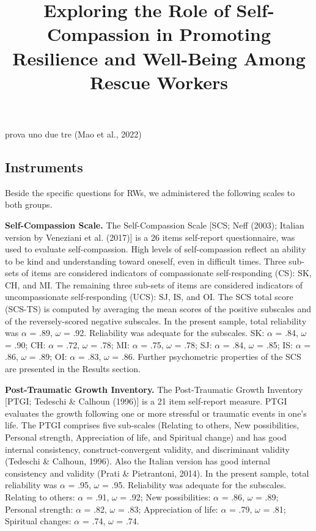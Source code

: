 \documentclass[
]{apa7}
\title{Exploring the Role of Self-Compassion in Promoting Resilience and
Well-Being Among Rescue Workers}
\author{}
\date{}
\begin{document}
\maketitle
\ifdefined\Shaded\renewenvironment{Shaded}{\begin{tcolorbox}[interior hidden, enhanced, breakable, borderline west={3pt}{0pt}{shadecolor}, sharp corners, boxrule=0pt, frame hidden]}{\end{tcolorbox}}\fi

prova uno due tre (Mao et al., 2022)

\hypertarget{instruments}{%
\subsection{Instruments}\label{instruments}}

Beside the specific questions for RWs, we administered the following
scales to both groups.

\textbf{Self-Compassion Scale.} The Self-Compassion Scale {[}SCS; Neff
(2003); Italian version by Veneziani et al. (2017){]} is a 26 items
self-report questionnaire, was used to evaluate self-compassion. High
levels of self-compassion reflect an ability to be kind and
understanding toward oneself, even in difficult times. Three sub-sets of
items are considered indicators of compassionate self-responding (CS):
SK, CH, and MI. The remaining three sub-sets of items are considered
indicators of uncompassionate self-responding (UCS): SJ, IS, and OI. The
SCS total score (SCS-TS) is computed by averaging the mean scores of the
positive subscales and of the reversely-scored negative subscales. In
the present sample, total reliability was \(\alpha\) = .89, \(\omega\) =
.92. Reliability was adequate for the subscales. SK: \(\alpha\) = .84,
\(\omega\) = .90; CH: \(\alpha\) = .72, \(\omega\) = .78; MI: \(\alpha\)
= .75, \(\omega\) = .78; SJ: \(\alpha\) = .84, \(\omega\) = .85; IS:
\(\alpha\) = .86, \(\omega\) = .89; OI: \(\alpha\) = .83, \(\omega\) =
.86. Further psychometric properties of the SCS are presented in the
Results section.

\textbf{Post-Traumatic Growth Inventory.} The Post-Traumatic Growth
Inventory {[}PTGI; Tedeschi \& Calhoun (1996){]} is a 21 item
self-report measure. PTGI evaluates the growth following one or more
stressful or traumatic events in one's life. The PTGI comprises five
sub-scales (Relating to others, New possibilities, Personal strength,
Appreciation of life, and Spiritual change) and has good internal
consistency, construct-convergent validity, and discriminant validity
(Tedeschi \& Calhoun, 1996). Also the Italian version has good internal
consistency and validity (Prati \& Pietrantoni, 2014). In the present
sample, total reliability was \(\alpha\) = .95, \(\omega\) = .95.
Reliability was adequate for the subscales. Relating to others:
\(\alpha\) = .91, \(\omega\) = .92; New possibilities: \(\alpha\) = .86,
\(\omega\) = .89; Personal strength: \(\alpha\) = .82, \(\omega\) = .83;
Appreciation of life: \(\alpha\) = .79, \(\omega\) = .81; Spiritual
changes: \(\alpha\) = .74, \(\omega\) = .74.
\end{document}
